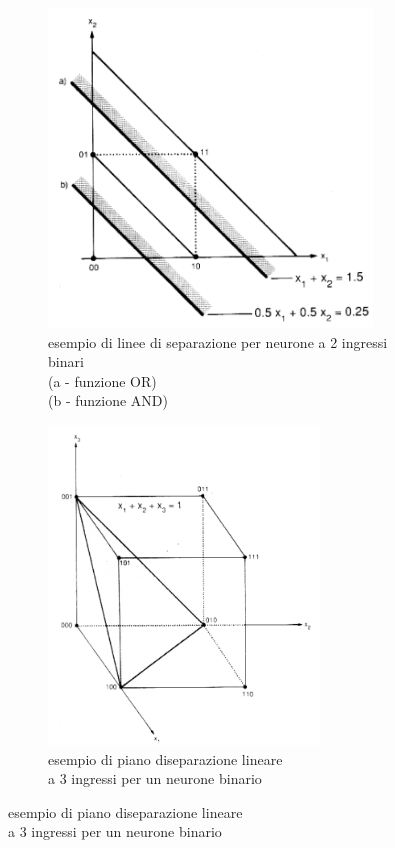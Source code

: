\documentclass[10pt,a4paper]{article}
\begin{document}
\begin{figure}[h!]
  \centering
  \begin{subfigure}[t]{0.45\linewidth}
  	\centering
    \includegraphics[height=240pt]{sepAndOr.png}
    \captionsetup{justification=centering}
    \caption*{esempio di linee di separazione per neurone a 2 ingressi binari\\
    (a - funzione OR)\\
    (b - funzione AND)}
  \end{subfigure}
  \begin{subfigure}[t]{0.45\linewidth}
  	\centering
    \includegraphics[height=240pt]{sepR3.png}
    \captionsetup{justification=centering}
    \caption*{esempio di piano diseparazione lineare \\ a 3 ingressi per un neurone binario}
  \end{subfigure}
  \label{fig:graph5}
\end{figure}
\end{document}
